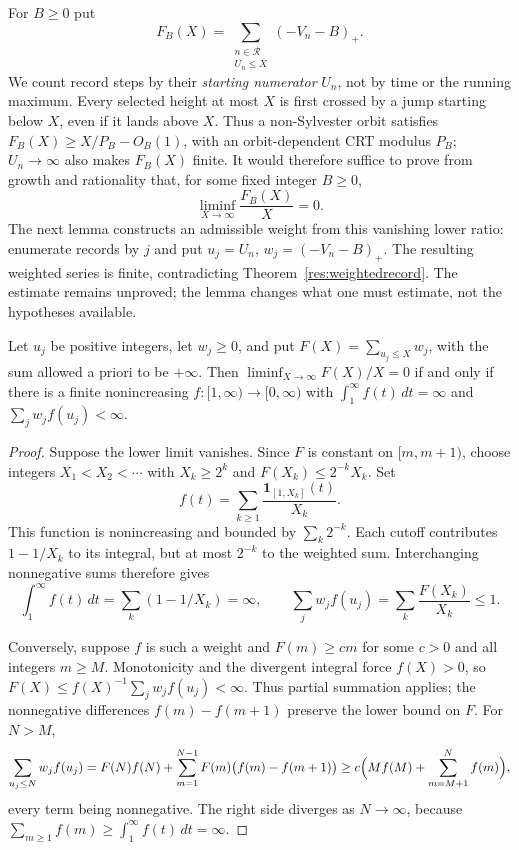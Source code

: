 \documentclass[11pt]{article}
\begin{document}
For $B\ge0$ put
\[
 F_B(X)=\sum_{\substack{n\in\mathcal R\\U_n\le X}}(-V_n-B)_+.
\]
We count record steps by their \emph{starting numerator} $U_n$, not
by time or the running maximum. Every selected height at most $X$ is first crossed
by a jump starting below $X$, even if it lands above $X$. Thus a
non-Sylvester orbit satisfies $F_B(X)\ge X/P_B-O_B(1)$, with an
orbit-dependent CRT modulus $P_B$; $U_n\to\infty$ also makes $F_B(X)$
finite. It would therefore suffice to prove from growth and rationality
that, for some fixed integer $B\ge0$,
\begin{equation}\label{eq:remaining-record-budget}
 \liminf_{X\to\infty}\frac{F_B(X)}X=0.
\end{equation}
The next lemma constructs an admissible weight from this vanishing
lower ratio: enumerate records by $j$ and put $u_j=U_n$,
$w_j=(-V_n-B)_+$. The resulting weighted series is finite, contradicting
Theorem~\ref{res:weightedrecord}. The estimate remains unproved; the
lemma changes what one must estimate, not the hypotheses available.

\begin{lemma}\label{res:weights}
Let $u_j$ be positive integers, let $w_j\ge0$, and put
$F(X)=\sum_{u_j\le X}w_j$, with the sum allowed a priori to be $+\infty$. Then $\liminf_{X\to\infty}F(X)/X=0$ if and only if
there is a finite nonincreasing $f:[1,\infty)\to[0,\infty)$ with
$\int_1^\infty f(t)\,dt=\infty$ and $\sum_jw_jf(u_j)<\infty$.
\end{lemma}

\begin{proof}
Suppose the lower limit vanishes. Since $F$ is constant on $[m,m+1)$, choose
integers $X_1<X_2<\cdots$ with $X_k\ge2^k$ and
$F(X_k)\le2^{-k}X_k$. Set
\[
 f(t)=\sum_{k\ge1}\frac{\mathbf 1_{[1,X_k]}(t)}{X_k}.
\]
This function is nonincreasing and bounded by $\sum_k2^{-k}$.
Each cutoff contributes $1-1/X_k$ to its integral, but at most $2^{-k}$
to the weighted sum. Interchanging nonnegative sums therefore gives
\[
 \int_1^\infty f(t)\,dt=\sum_k(1-1/X_k)=\infty,
 \qquad
 \sum_jw_jf(u_j)=\sum_k\frac{F(X_k)}{X_k}\le1.
\]

Conversely, suppose $f$ is such a weight and $F(m)\ge cm$ for some
$c>0$ and all integers $m\ge M$. Monotonicity and the divergent integral
force $f(X)>0$, so $F(X)\le f(X)^{-1}\sum_jw_jf(u_j)<\infty$.
Thus partial summation applies; the nonnegative differences
$f(m)-f(m+1)$ preserve the lower bound on $F$. For $N>M$,
\[
 \sum_{u_j\le N}w_jf(u_j)
 =F(N)f(N)+\sum_{m=1}^{N-1}F(m)\bigl(f(m)-f(m+1)\bigr)
 \ge c\Bigl(Mf(M)+\sum_{m=M+1}^{N}f(m)\Bigr),
\]
every term being nonnegative. The right side diverges as $N\to\infty$, because
$\sum_{m\ge1}f(m)\ge\int_1^\infty f(t)\,dt=\infty$.
\end{proof}
\end{document}

